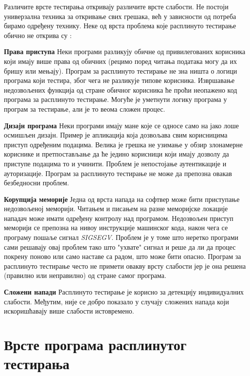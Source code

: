 \documentclass[12pt,oneside]{memoir}
\begin{document}
Различите врсте тестирања откривају различите врсте слабости. Не постоји универзална техника за откривање свих грешака, већ у зависности од потреба бирамо одређену технику. Неке од врста проблема које расплинуто тестирање обично не открива су \cite{fuzzingBrute}:
\begin{description}
\item \textbf{Права приступа} Неки програми разликују обичне од привилегованих корисника који имају више права од обичних (рецимо поред читања података могу да их бришу или мењају). Програм за расплинуто тестирање не зна ништа о логици програма који тестира, због чега не разликује типове корисника. Извршавање недозвољених функција од стране обичног корисника ће проћи неопажено код програма за расплинуто тестирање. Могуће је уметнути логику програма у програм за тестирање, али је то веома сложен процес.  
\item \textbf{Дизајн програма} Неки програми имају мане које се односе само на јако лоше осмишљен дизајн. Пример је апликација која дозвољава свим корисницима приступ одређеним подацима. Велика је грешка не узимање у обзир злонамерне кориснике и претпостављање да ће једино корисници који имају дозволу да приступе подацима то и учинити. Проблем је непостојање аутентикације и ауторизације. Програм за расплинуто тестирање не може да препозна овакав безбедносни проблем.
\item \textbf{Корупција меморије} Једна од врста напада на софтвер може бити приступање недозвољеној меморији. Читањем и писањем на разне меморијске локације нападач може имати одређену контролу над програмом. Недозвољен приступ меморији се препозна на нивоу инструкције машинског кода, након чега се програму пошаље сигнал \textit{SIGSEGV}. Проблем је у томе што неретко програми сами решавају овај проблем тако што "ухвате" сигнал и реше да ли да процес покрену поново или само наставе са радом, што може бити опасно. Програм за расплинуто тестирање често не примети овакву врсту слабости јер је она решена (правилно или неправилно) од стране самог програма.
\item \textbf{Сложени напади} Расплинуто тестирање је корисно за детекцију индивидуалних слабости. Међутим, није се добро показало у случају сложених напада који искоришћавају више слабости истовремено.
\end{description}

\section{Врсте програма расплинутог тестирања}
\label{subsec:metode}
\end{document}
